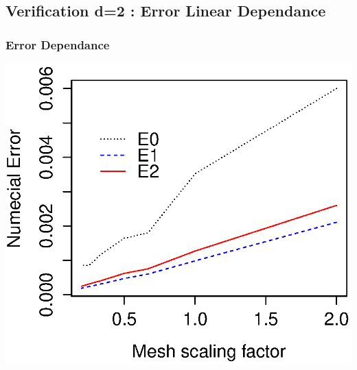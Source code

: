 \documentclass[]{beamer}
\begin{document}
\subsection{Verification d=2 : Error Linear Dependance}
\frametitle{Error Dependance}
\begin{frame}
\begin{center}
\includegraphics[scale=0.6,keepaspectratio=true]{linear_error}
\end{center}
\end{frame}
\end{document}
